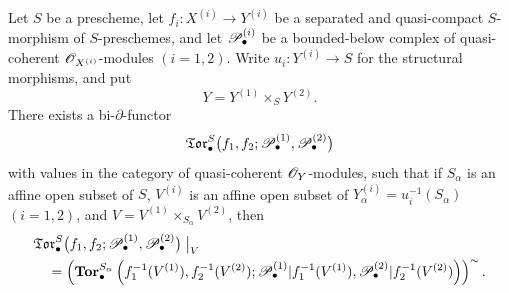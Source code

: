 \begin{theorem}[6.7.3]
\label{III.6.7.3}
Let $S$ be a prescheme, let
$f_i:X^{(i)}\to Y^{(i)}$ be a separated and quasi-compact
$S$-morphism of $S$-preschemes, and let
$\mathscr{P}_\bullet^{(i)}$ be a bounded-below complex of
quasi-coherent $\mathscr{O}_{X^{(i)}}$-modules $(i=1,2)$.  Write
$u_i:Y^{(i)}\to S$ for the structural morphisms, and put
\[
  Y=Y^{(1)}\times_SY^{(2)}.
\]
There exists a bi-$\partial$-functor
\[
  \mathfrak{Tor}_\bullet^S
  \bigl(
    f_1,f_2;
    \mathscr{P}_\bullet^{(1)},\mathscr{P}_\bullet^{(2)}
  \bigr)
\]
with values in the category of quasi-coherent
$\mathscr{O}_Y$-modules, such that if $S_\alpha$ is an affine open
subset of $S$, $V^{(i)}$ is an affine open subset of
$Y_\alpha^{(i)}=u_i^{-1}(S_\alpha)$ $(i=1,2)$, and
$V=V^{(1)}\times_{S_\alpha}V^{(2)}$, then
\[
\begin{split}
  &\mathfrak{Tor}_\bullet^S
  \bigl(
    f_1,f_2;
    \mathscr{P}_\bullet^{(1)},\mathscr{P}_\bullet^{(2)}
  \bigr)\bigm|_V\\
  &\quad=
  \left(
    \mathbf{Tor}_\bullet^{S_\alpha}
    \left(
      f_1^{-1}(V^{(1)}),f_2^{-1}(V^{(2)});
      \mathscr{P}_\bullet^{(1)}|f_1^{-1}(V^{(1)}),
      \mathscr{P}_\bullet^{(2)}|f_2^{-1}(V^{(2)})
    \right)
  \right)^{\sim} .
\end{split}
\]



\end{theorem}
